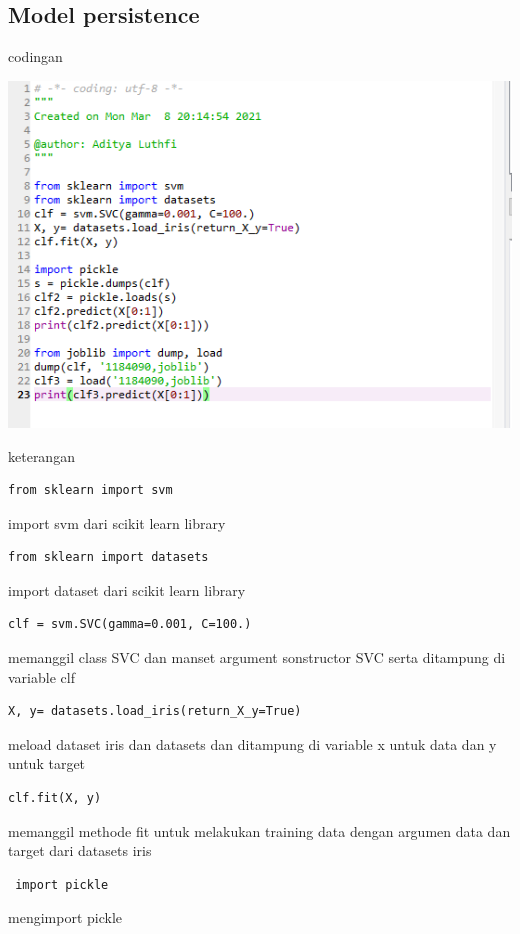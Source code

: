 \documentclass{article}
\begin{document}
\subsection{Model persistence}
codingan
\begin{center}
    \includegraphics[width=.8\textwidth]{figures/1184090/chapter1/6.PNG}
\end{center}

keterangan
\begin{verbatim}from sklearn import svm\end{verbatim}import svm dari scikit learn library
		
		\begin{verbatim}from sklearn import datasets\end{verbatim}import dataset dari scikit learn library
        
        \begin{verbatim}clf = svm.SVC(gamma=0.001, C=100.)\end{verbatim} memanggil class SVC dan manset argument sonstructor SVC serta ditampung di variable clf
        
        \begin{verbatim}X, y= datasets.load_iris(return_X_y=True) \end{verbatim}meload dataset iris dan datasets dan ditampung di variable x untuk data dan y untuk target

        \begin{verbatim}clf.fit(X, y)\end{verbatim}memanggil methode fit untuk melakukan training data dengan argumen data dan target dari datasets iris

        \begin{verbatim} import pickle\end{verbatim} mengimport pickle
        
\end{document}
